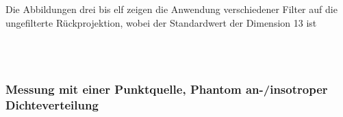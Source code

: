                 Die Abbildungen drei bis elf zeigen die Anwendung verschiedener Filter auf die ungefilterte Rückprojektion, wobei der Standardwert der Dimension 13 ist
            
            \minipend\\ \ \\            
            
            
        \subsubsection{Messung mit einer Punktquelle, Phantom an-/insotroper Dichteverteilung}
